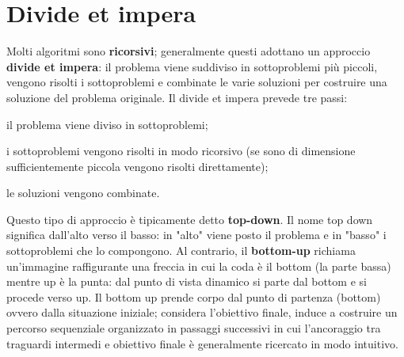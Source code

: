 \documentclass[11pt,a4paper]{article}
\begin{document}
\section{Divide et impera}
Molti algoritmi sono \textbf{ricorsivi}; generalmente questi adottano un approccio \textbf{divide et impera}: il problema viene
suddiviso in sottoproblemi più piccoli, vengono risolti i sottoproblemi e combinate le varie soluzioni per
costruire una soluzione del problema originale.
Il divide et impera prevede tre passi:
\begin{description}[leftmargin=*]
  \item[Divide] il problema viene diviso in sottoproblemi;
  \item[Impera] i sottoproblemi vengono risolti in modo ricorsivo (se sono di dimensione sufficientemente piccola
  vengono risolti direttamente);
  \item[Combina] le soluzioni vengono combinate.
\end{description}
Questo tipo di approccio è tipicamente detto \textbf{top-down}. Il nome top down significa dall'alto verso il basso: in
"alto" viene posto il problema e in "basso" i sottoproblemi che lo compongono. Al contrario, il \textbf{bottom-up}
richiama un'immagine raffigurante una freccia in cui la coda è il bottom (la parte bassa) mentre up è la punta:
dal punto di vista dinamico si parte dal bottom e si procede verso up.
Il bottom up prende corpo dal punto di partenza (bottom) ovvero dalla situazione iniziale; considera l'obiettivo
finale, induce a costruire un percorso sequenziale organizzato in passaggi successivi in cui l'ancoraggio tra
traguardi intermedi e obiettivo finale è generalmente ricercato in modo intuitivo.
\end{document}
